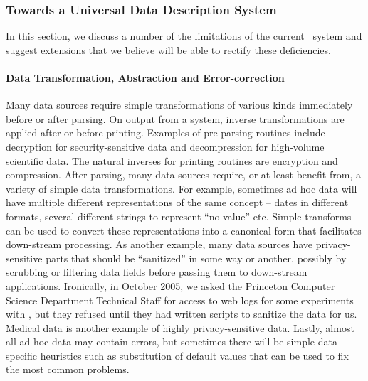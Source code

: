 \documentclass[11pt]{article}
\begin{document}
\subsubsection{Towards a Universal Data Description System}

In this
section, we discuss a number of the limitations of the current \pads{}\ 
system and suggest extensions that we believe will be able to rectify
these deficiencies.  

\paragraph*{Data Transformation, Abstraction and Error-correction}
Many data sources require simple transformations of various kinds
immediately before or after parsing.  On output from a system,
inverse transformations are applied after or before printing.  
Examples of pre-parsing routines include decryption for
security-sensitive data and decompression for high-volume scientific data.  
The natural inverses for printing routines are encryption and compression.
After parsing, many data sources require, or at least benefit from,
a variety of simple data transformations.  For example,
sometimes ad hoc data will have multiple different representations
of the same concept -- dates in different formats, several different strings
to represent ``no value'' etc.  Simple transforms can be used to convert
these representations into a canonical form that facilitates down-stream
processing.  As another example, many data sources have privacy-sensitive parts
that should be ``sanitized'' in some way or another, possibly by scrubbing or
filtering data fields before passing them to down-stream applications.
Ironically, in October 2005, we asked the Princeton Computer Science
Department Technical Staff for access to web logs for some experiments
with \pads, but they refused until they had written scripts to
sanitize the data for us.  Medical data is another example of highly
privacy-sensitive data.
Lastly, almost all ad hoc data may contain errors, but sometimes there will be simple data-specific heuristics such as substitution of default values
that can be used to fix the most common problems.
\end{document}
